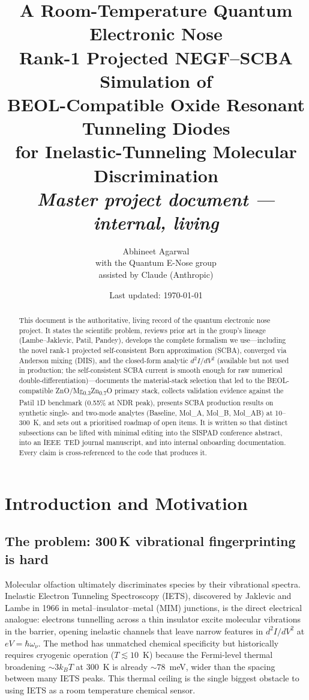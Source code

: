 \documentclass[11pt,a4paper,onecolumn]{article}
\title{\Huge A Room-Temperature Quantum Electronic Nose\\[4pt]
\Large Rank-1 Projected NEGF--SCBA Simulation of\\
BEOL-Compatible Oxide Resonant Tunneling Diodes\\
for Inelastic-Tunneling Molecular Discrimination\\[8pt]
\large\textit{Master project document — internal, living}}
\author{Abhineet Agarwal\\
\small with the Quantum E-Nose group\\
\small assisted by Claude (Anthropic)}
\date{Last updated: \today}
\begin{document}
\maketitle

\begin{abstract}\noindent
This document is the authoritative, living record of the quantum
electronic nose project. It states the scientific problem, reviews prior
art in the group's lineage (Lambe--Jaklevic, Patil, Pandey), develops the
complete formalism we use---including the novel rank-1 projected
self-consistent Born approximation (SCBA), converged via Anderson mixing
(DIIS), and the closed-form analytic $d^2I/dV^2$ (available but not used
in production; the self-consistent SCBA current is smooth enough for raw
numerical double-differentiation)---documents the material-stack selection
that led to the BEOL-compatible
ZnO/Mg\textsubscript{0.3}Zn\textsubscript{0.7}O primary stack, collects
validation evidence against the Patil 1D benchmark (0.55\% at NDR peak),
presents SCBA production results on synthetic single- and two-mode
analytes (Baseline, Mol\_A, Mol\_B, Mol\_AB) at 10--300~K, and sets out
a prioritised roadmap of open items. It is written so that distinct
subsections can be lifted with minimal editing into the SISPAD conference
abstract, into an IEEE~TED journal manuscript, and into internal
onboarding documentation. Every claim is cross-referenced to the code
that produces it.
\end{abstract}

\tableofcontents
\newpage

\section{Introduction and Motivation}

\subsection{The problem: 300\,K vibrational fingerprinting is hard}
Molecular olfaction ultimately discriminates species by their vibrational
spectra. Inelastic Electron Tunneling Spectroscopy (IETS), discovered by
Jaklevic and Lambe in 1966 in metal--insulator--metal (MIM) junctions, is
the direct electrical analogue: electrons tunnelling across a thin
insulator excite molecular vibrations in the barrier, opening inelastic
channels that leave narrow features in $d^2I/dV^2$ at
$eV = \hbar\omega_\nu$. The method has unmatched chemical specificity but
historically requires cryogenic operation ($T \lesssim 10$~K) because the
Fermi-level thermal broadening $\sim\! 3k_BT$ at 300~K is already
$\sim\! 78$~meV, wider than the spacing between many IETS peaks. This
thermal ceiling is the single biggest obstacle to using IETS as a room
temperature chemical sensor.
\end{document}
